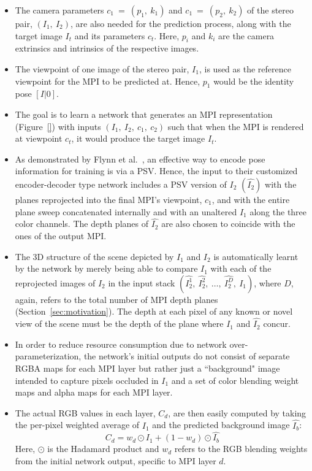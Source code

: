 \begin{itemize}
    \item The camera parameters $c_1\ =\ (p_1,\ k_1)$ and $c_1\ =\ (p_2,\ k_2)$ of the stereo pair, $(I_1,\ I_2)$, are also needed for the prediction process, along with the target image $I_t$ and its parameters $c_t$. Here, $p_i$ and $k_i$ are the camera extrinsics and intrinsics of the respective images.
    \item The viewpoint of one image of the stereo pair, $I_1$, is used as the reference viewpoint for the MPI to be predicted at. Hence, $p_1$ would be the identity pose $[I|\boldsymbol{\mathit{0}}]$.
    \item The goal is to learn a network that generates an MPI representation (Figure~\ref{}) with inputs $(I_1,\ I_2,\ c_1,\ c_2)$ such that when the MPI is rendered at viewpoint $c_t$, it would produce the target image $I_t$. 
    \item As demonstrated by Flynn et al.~\cite{deep_stereo_2016}, an effective way to encode pose information for training is via a PSV. Hence, the input to their customized encoder-decoder type network includes a PSV version of $I_2$ $(\hat{I_2})$ with the planes reprojected into the final MPI's viewpoint, $c_1$, and with the entire plane sweep concatenated internally and with an unaltered $I_1$ along the three color channels. The depth planes of $\hat{I_2}$ are also chosen to coincide with the ones of the output MPI.
    \item The 3D structure of the scene depicted by $I_1$ and $I_2$ is automatically learnt by the network by merely being able to compare $I_1$ with each of the reprojected images of $I_2$ in the input stack $(\hat{I_2^1},\ \hat{I_2^2},\ \ldots,\ \hat{I_2^D},\  I_1)$, where $D$, again, refers to the total number of MPI depth planes (Section~\ref{sec:motivation}). The depth at each pixel of any known or novel view of the scene must be the depth of the plane where $I_1$ and $\hat{I_2}$ concur.
    \item In order to reduce resource consumption due to network over-parameterization, the network's initial outputs do not consist of separate RGBA maps for each MPI layer but rather just a ``background" image intended to capture pixels occluded in $I_1$ and a set of color blending weight maps and alpha maps for each MPI layer.
    \item The actual RGB values in each layer, $C_d$, are then easily computed by taking the per-pixel weighted average of $I_1$ and the predicted background image $\hat{I_b}$: \[ C_d = w_d \odot I_1 + (1 - w_d) \odot \hat{I_b} \] Here, $\odot$ is the Hadamard product and $w_d$ refers to the RGB blending weights from the initial network output, specific to MPI layer $d$.
\end{itemize}

